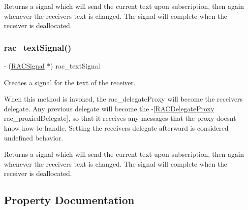 Returns a signal which will send the current text upon subscription, then again whenever the receiver\textquotesingle{}s text is changed. The signal will complete when the receiver is deallocated. \mbox{\label{category_u_i_text_view_07_r_a_c_signal_support_08_aad510c683b60bb5788035a21f860690d}} 
\subsubsection{\texorpdfstring{rac\+\_\+text\+Signal()}{rac\_textSignal()}\hspace{0.1cm}{\footnotesize\ttfamily [3/3]}}
{\footnotesize\ttfamily -\/ (\mbox{\hyperlink{interface_r_a_c_signal}{R\+A\+C\+Signal}} $\ast$) rac\+\_\+text\+Signal \begin{DoxyParamCaption}{ }\end{DoxyParamCaption}}

Creates a signal for the text of the receiver.

When this method is invoked, the {\ttfamily rac\+\_\+delegate\+Proxy} will become the receiver\textquotesingle{}s delegate. Any previous delegate will become the -\/\mbox{[}\mbox{\hyperlink{interface_r_a_c_delegate_proxy}{R\+A\+C\+Delegate\+Proxy}} rac\+\_\+proxied\+Delegate\mbox{]}, so that it receives any messages that the proxy doesn\textquotesingle{}t know how to handle. Setting the receiver\textquotesingle{}s {\ttfamily delegate} afterward is considered undefined behavior.

Returns a signal which will send the current text upon subscription, then again whenever the receiver\textquotesingle{}s text is changed. The signal will complete when the receiver is deallocated. 

\subsection{Property Documentation}
\mbox{\label{category_u_i_text_view_07_r_a_c_signal_support_08_a7bb09ed468da0a4a9e4691b2301fddd7}} 
